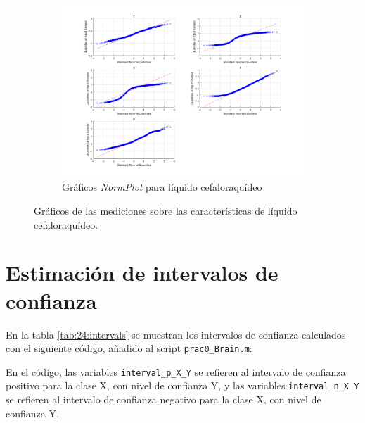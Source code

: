 \documentclass[11pt]{article} %
\begin{document}
\begin{figure}[h]
\begin{subfigure}[b]{0.475 \textwidth}
		\includegraphics[width = \textwidth]{./23/3_liquido/plotnorm.png}
		\caption{Gráficos \emph{NormPlot} para líquido cefaloraquídeo}
		\label{fig:23:liquid:normplot}
	\end{subfigure}
	\caption{Gráficos de las mediciones sobre las características de líquido cefaloraquídeo.}
	\label{fig:23:liquid}
\end{figure}

\newpage

\section[Int. confianza]{Estimación de intervalos de confianza}

En la tabla \ref{tab:24:intervals} se muestran los intervalos de confianza calculados con el siguiente código, añadido al script \texttt{prac0\_Brain.m}:



En el código, las variables \texttt{interval\_p\_X\_Y} se refieren al intervalo de confianza positivo para la clase X, con nivel de confianza Y, y las variables \texttt{interval\_n\_X\_Y} se refieren al intervalo de confianza negativo para la clase X, con nivel de confianza Y.
\end{document}
